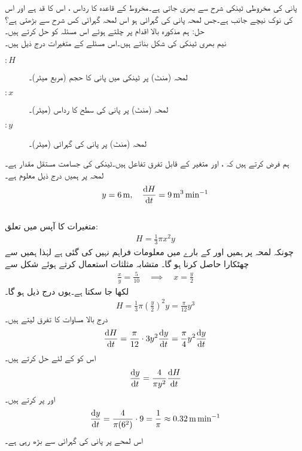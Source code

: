 پانی کی مخروطی ٹینکی   شرح سے بھری جاتی ہے۔مخروط کے قاعدہ کا رداس ، اس کا قد  ہے  اور اس کی نوک نیچے جانب ہے۔جس لمحہ پانی کی گہرائی  ہو اس لمحہ گہرائی کس شرح سے بڑھتی ہے؟\\
حل:\quad
ہم مذکورہ بالا اقدام پر چلتے ہوئے اس مسئلہ کو حل کرتے ہیں۔\\
\quad
{} نیم بھری ٹینکی کی شکل بناتے ہیں۔اس مسئلے کے متغیرات درج ذیل ہیں۔
\begin{description}
\item[$:H$]
لمحہ  (منٹ) پر ٹینکی میں پانی کا حجم (مربع میٹر)۔
\item[$:x$]
لمحہ  (منٹ) پر پانی کی سطح کا رداس (میٹر)۔
\item[$:y$]
لمحہ  (منٹ) پر پانی کی گہرائی (میٹر)۔
\end{description}
ہم فرض کرتے ہیں کہ ،  اور  متغیر  کے قابل تفرق تفاعل ہیں۔ٹینکی کی جسامت مستقل مقدار ہے۔\\
\quad
{} لمحہ  پر ہمیں درج ذیل معلوم ہے۔
\begin{align*}
y=\SI{6}{\meter},\quad \frac{\dif H}{\dif t}=\SI{9}{\meter\cubed\per\minute}
\end{align*}
\quad
{}  \\
\quad
متغیرات کا آپس میں تعلق:
\begin{align*}
H=\frac{1}{3}\pi x^2 y
\end{align*}
چونکہ لمحہ  پر ہمیں  اور  کے بارے میں معلومات فراہم نہیں کی گئی ہے لہٰذا ہمیں  سے چھٹکارا حاصل کرنا ہو گا۔ متشابہ مثلثات استعمال کرتے ہوئے شکل سے
\begin{align*}
\frac{x}{y}=\frac{5}{10}\quad \implies \quad x=\frac{y}{2}
\end{align*}
لکھا جا سکتا ہے۔یوں درج ذیل ہو گا۔
\begin{align*}
H=\frac{1}{3}\pi (\tfrac{y}{2})^2y=\frac{\pi}{12}y^3
\end{align*}
\quad
{}  درج بالا مساوات کا تفرق لیتے ہیں۔
\begin{align*}
\frac{\dif H}{\dif t}=\frac{\pi}{12} \cdot 3y^2\frac{\dif y}{\dif t}=\frac{\pi}{4}y^2\frac{\dif y}{\dif t}
\end{align*}
اس کو  کے لئے حل کرتے ہیں۔
\begin{align*}
\frac{\dif y}{\dif t}=\frac{4}{\pi y^2}\frac{\dif H}{\dif t}
\end{align*}
\quad
{}   اور  پر کرتے ہیں۔
\begin{align*}
\frac{\dif y}{\dif t}=\frac{4}{\pi (6^2)}\cdot 9=\frac{1}{\pi}\approx \SI{0.32}{\meter\per\minute}
\end{align*}
اس لمحے پر پانی کی گہرائی   سے بڑھ رہی ہے۔


